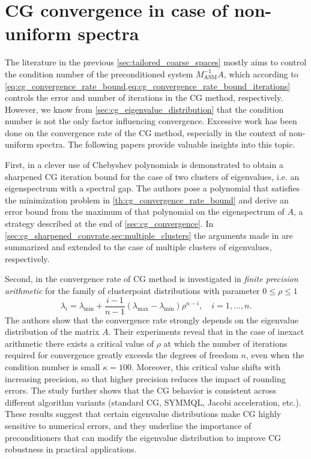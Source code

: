 \section{CG convergence in case of non-uniform spectra}\label{sec:cg_nonuniform_spectra}
The literature in the previous \cref{sec:tailored_coarse_spaces} mostly aims to control the condition number of the preconditioned system $M_{\text{ASM}}^{-1}A$, which according to \cref{eq:cg_convergence_rate_bound,eq:cg_convergence_rate_bound_iterations} controls the error and number of iterations in the CG method, respectively. However, we know from \cref{sec:cg_eigenvalue_distribution} that the condition number is not the only factor influencing convergence. Excessive work has been done on the convergence rate of the CG method, especially in the context of non-uniform spectra. The following papers provide valuable insights into this topic.

First, in \cite{cg_sharpened_convrate_Axelsson1976} a clever use of Chebyshev polynomials is demonstrated to obtain a sharpened CG iteration bound for the case of two clusters of eigenvalues, i.e. an eigenspectrum with a spectral gap. The authors pose a polynomial that satisfies the minimization problem in \cref{th:cg_convergence_rate_bound} and derive an error bound from the maximum of that polynomial on the eigenspectrum of $A$, a strategy described at the end of \cref{sec:cg_convergence}. In \cref{sec:cg_sharpened_convrate,sec:multiple_clusters} the arguments made in \cite{cg_sharpened_convrate_Axelsson1976} are summarized and extended to the case of multiple clusters of eigenvalues, respectively.

Second, in \cite{cg_convrate_Strakos1991} the convergence rate of CG method is investigated in \textit{finite precision arithmetic} for the family of clusterpoint distributions with parameter $0 \leq \rho \leq 1$
\[
    \lambda_i = \lambda_{\text{min}} + \frac{i-1}{n-1}(\lambda_{\text{max}} - \lambda_{\text{min}})\rho^{n-i}, \quad i=1,\ldots,n.
\]
The authors show that the convergence rate strongly depends on the eigenvalue distribution of the matrix $A$. Their experiments reveal that in the case of inexact arithmetic there exists a critical value of $\rho$ at which the number of iterations required for convergence greatly exceeds the degrees of freedom $n$, even when the condition number is small $\kappa=100$. Moreover, this critical value shifts with increasing precision, so that higher precision reduces the impact of rounding errors. The study further shows that the CG behavior is consistent across different algorithm variants (standard CG, SYMMQL, Jacobi acceleration, etc.). These results suggest that certain eigenvalue distributions make CG highly sensitive to numerical errors, and they underline the importance of preconditioners that can modify the eigenvalue distribution to improve CG robustness in practical applications.

